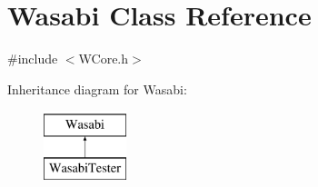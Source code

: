 \hypertarget{class_wasabi}{}\section{Wasabi Class Reference}
\label{class_wasabi}


{\ttfamily \#include $<$W\+Core.\+h$>$}

Inheritance diagram for Wasabi\+:\begin{figure}[H]
\begin{center}
\leavevmode
\includegraphics[height=2.000000cm]{class_wasabi}
\end{center}
\end{figure}
